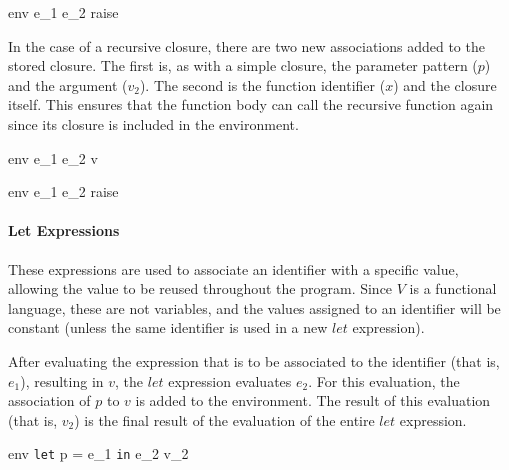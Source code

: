\documentclass{article}
\begin{document}
    {\mbox{env} \vdash e_1 \; e_2 \Downarrow raise}

In the case of a recursive closure, there are two new associations added to the stored closure.
The first is, as with a simple closure, the parameter pattern ($p$) and the argument ($v_2$).
The second is the function identifier ($x$) and the closure itself.
This ensures that the function body can call the recursive function again since its closure is included in the environment.

    {\mbox{env} \vdash e_1 \; e_2 \Downarrow v}

    {\mbox{env} \vdash e_1 \; e_2 \Downarrow raise}

\paragraph{Let Expressions}
These expressions are used to associate an identifier with a specific value, allowing the value to be reused throughout the program.
Since $V$ is a functional language, these are not variables, and the values assigned to an identifier will be constant (unless the same identifier is used in a new $let$ expression).

After evaluating the expression that is to be associated to the identifier (that is, $e_1$), resulting in $v$, the $let$ expression evaluates $e_2$.
For this evaluation, the association of $p$ to $v$ is added to the environment.
The result of this evaluation (that is, $v_2$) is the final result of the evaluation of the entire $let$ expression.

    {\mbox{env} \vdash \texttt{let} \; p = e_1 \; \texttt{in} \; e_2 \Downarrow v_2}
\end{document}
